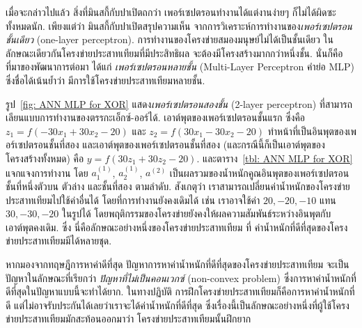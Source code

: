 เมื่อจะกล่าวไปแล้ว สิ่งที่มินสกี้กับปาเปิตถกว่า เพอร์เซปตรอนทำงานได้แต่งานง่ายๆ ก็ไม่ได้ผิดซะทั้งหมดนัก.
เพียงแต่ว่า มินสกี้กับปาเปิตสรุปความเห็น จากการวิเคราะห์การทำงานของ\textit{เพอร์เซปตรอนชั้นเดียว} (one-layer perceptron).
การทำงานของโครงข่ายสมองมนุษย์ไม่ได้เป็นชั้นเดียว 
ในลักษณะเดียวกันโครงข่ายประสาทเทียมที่มีประสิทธิผล จะต้องมีโครงสร้างมากกว่าหนึ่งชั้น.
นั่นก็คือ ที่มาของพัฒนาการต่อมา ได้แก่ \textit{เพอร์เซปตรอนหลายชั้น} (Multi-Layer Perceptron คำย่อ MLP) ซึ่งชื่อได้เน้นย้ำว่า มีการใช้โครงข่ายประสาทเทียมหลายชั้น.

รูป~\ref{fig: ANN MLP for XOR} แสดง\textit{เพอร์เซปตรอนสองชั้น} (2-layer perceptron) ที่สามารถเลียนแบบการทำงานของตรรกะเอ็กซ์-ออร์ได้.
เอาต์พุตของเพอร์เซปตรอนชั้นแรก ซึ่งคือ $z_1 = f(-30 x_1 + 30 x_2 - 20)$ และ $z_2 = f(30 x_1 - 30 x_2 - 20)$
ทำหน้าที่เป็นอินพุตของเพอร์เซปตรอนชั้นที่สอง
และเอาต์พุตของเพอร์เซปตรอนชั้นที่สอง (และกรณีนี้ก็เป็นเอาต์พุตของโครงสร้างทั้งหมด) คือ $y = f(30 z_1 + 30 z_2 - 20)$.
และตาราง~\ref{tbl: ANN MLP for XOR} แจกแจงการทำงาน โดย $a^{(1)}_1$, $a^{(1)}_2$, $a^{(2)}$ เป็นผลรวมของน้ำหนักคูณอินพุตของเพอร์เซปตรอนชั้นที่หนึ่งตัวบน ตัวล่าง และชั้นที่สอง ตามลำดับ.
สังเกตุว่า เราสามารถเปลี่ยนค่าน้ำหนักของโครงข่ายประสาทเทียมไปใช้ค่าอื่นได้ โดยที่การทำงานยังคงเดิมได้ 
เช่น เราอาจใช้ค่า $20, -20, -10$ แทน $30, -30, -20$ ในรูปได้ โดยพฤติกรรมของโครงข่ายยังคงให้ผลความสัมพันธ์ระหว่างอินพุตกับเอาต์พุตคงเดิม.
ซึ่ง นี่คือลักษณะอย่างหนึ่งของโครงข่ายประสาทเทียม ที่ ค่าน้ำหนักที่ดีที่สุดของโครงข่ายประสาทเทียมมีได้หลายชุด.

{\small
\begin{shaded}
หากมองจากทฤษฎีการหาค่าดีที่สุด  
ปัญหาการหาค่าน้ำหนักที่ดีที่สุดของโครงข่ายประสาทเทียม จะเป็นปัญหาในลักษณะที่เรียกว่า \textit{ปัญหาที่ไม่เป็นคอนเวกซ์} (non-convex problem)
ซึ่งการหาค่าน้ำหนักที่ดีที่สุดในปัญหาแบบนี้จะทำได้ยาก.
%
ในทางปฏิบัติ การฝึกโครงข่ายประสาทเทียมก็คือการหาค่าน้ำหนักที่ดี 
แต่ไม่อาจรับประกันได้เลยว่าเราจะได้ค่าน้ำหนักที่ดีที่สุด 
ซึ่งเรื่องนี้เป็นลักษณะอย่างหนึ่งที่ผู้ใช้โครงข่ายประสาทเทียมมักสะท้อนออกมาว่า
โครงข่ายประสาทเทียมนั้นฝึกยาก
\end{shaded}
}

